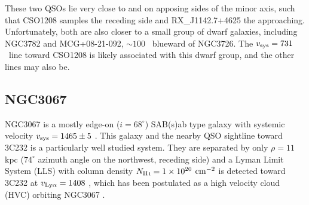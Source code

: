 These two QSOs lie very close to and on apposing sides of the minor axis, such that CSO1208 samples the receding side and RX\_J1142.7+4625 the approaching. Unfortunately, both are also closer to a small group of dwarf galaxies, including NGC3782 and MCG+08-21-092, $\sim 100$ \kms~blueward of NGC3726. The $v_{\rm sys} = 731$ \kms~line toward CSO1208 is likely associated with this dwarf group, and the other lines may also be.






%



\subsection{NGC3067}
NGC3067 is a mostly edge-on ($i = 68^{\circ}$) SAB(s)ab type galaxy with systemic velocity $v_{\rm sys} = 1465 \pm 5$ \kms. This galaxy and the nearby QSO sightline toward 3C232 is a particularly well studied system. They are separated by only $\rho = 11$ kpc ($74^{\circ}$ azimuth angle on the northwest, receding side) and a Lyman Limit System (LLS) with column density $N_{\scriptsize \mbox{H\,{\sc i}}} = 1 \times 10^{20}$ $\rm cm^{-2}$ is detected toward 3C232 at $v_{\rm Ly\alpha} = 1408$ \kms, which has been postulated as a high velocity cloud (HVC) orbiting NGC3067 \citep{carilli1989, keeney2005}. 

